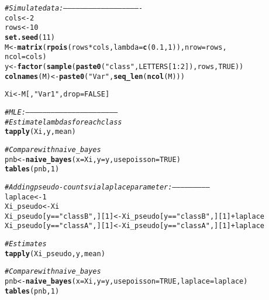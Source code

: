 \documentclass{article}\usepackage[]{graphicx}\usepackage[]{color}
\makeatletter
\newcommand{\hlnum}[1]{\textcolor[rgb]{0.686,0.059,0.569}{#1}}%
\newcommand{\hlstr}[1]{\textcolor[rgb]{0.192,0.494,0.8}{#1}}%
\newcommand{\hlcom}[1]{\textcolor[rgb]{0.678,0.584,0.686}{\textit{#1}}}%
\newcommand{\hlopt}[1]{\textcolor[rgb]{0,0,0}{#1}}%
\newcommand{\hlstd}[1]{\textcolor[rgb]{0.345,0.345,0.345}{#1}}%
\newcommand{\hlkwb}[1]{\textcolor[rgb]{0.69,0.353,0.396}{#1}}%
\newcommand{\hlkwc}[1]{\textcolor[rgb]{0.333,0.667,0.333}{#1}}%
\newcommand{\hlkwd}[1]{\textcolor[rgb]{0.737,0.353,0.396}{\textbf{#1}}}%
\newenvironment{kframe}{%
 \def\at@end@of@kframe{}%
 \ifinner\ifhmode%
  \def\at@end@of@kframe{\end{minipage}}%
  \begin{minipage}{\columnwidth}%
 \fi\fi%
 \def\FrameCommand##1{\hskip\@totalleftmargin \hskip-\fboxsep
 \colorbox{shadecolor}{##1}\hskip-\fboxsep
     \hskip-\linewidth \hskip-\@totalleftmargin \hskip\columnwidth}%
 \MakeFramed {\advance\hsize-\width
   \@totalleftmargin\z@ \linewidth\hsize
   \@setminipage}}%
 {\par\unskip\endMakeFramed%
 \at@end@of@kframe}
\newenvironment{knitrout}{}{} %
\makeatother
\begin{document}
\begin{knitrout}
\color{fgcolor}\begin{kframe}
\begin{alltt}
\hlcom{# Simulate data: -------------------------------------------------------}
\hlstd{cols} \hlkwb{<-} \hlnum{2}
\hlstd{rows} \hlkwb{<-} \hlnum{10}
\hlkwd{set.seed}\hlstd{(}\hlnum{11}\hlstd{)}
\hlstd{M} \hlkwb{<-} \hlkwd{matrix}\hlstd{(}\hlkwd{rpois}\hlstd{(rows} \hlopt{*} \hlstd{cols,} \hlkwc{lambda} \hlstd{=} \hlkwd{c}\hlstd{(}\hlnum{0.1}\hlstd{,}\hlnum{1}\hlstd{)),} \hlkwc{nrow} \hlstd{= rows,}
            \hlkwc{ncol} \hlstd{= cols)}
\hlstd{y} \hlkwb{<-} \hlkwd{factor}\hlstd{(}\hlkwd{sample}\hlstd{(}\hlkwd{paste0}\hlstd{(}\hlstr{"class"}\hlstd{, LETTERS[}\hlnum{1}\hlopt{:}\hlnum{2}\hlstd{]), rows,} \hlnum{TRUE}\hlstd{))}
\hlkwd{colnames}\hlstd{(M)} \hlkwb{<-} \hlkwd{paste0}\hlstd{(}\hlstr{"Var"}\hlstd{,} \hlkwd{seq_len}\hlstd{(}\hlkwd{ncol}\hlstd{(M)))}

\hlstd{Xi} \hlkwb{<-} \hlstd{M[ ,}\hlstr{"Var1"}\hlstd{,} \hlkwc{drop} \hlstd{=} \hlnum{FALSE}\hlstd{]}

\hlcom{# MLE: -----------------------------------------------------------------}
\hlcom{# Estimate lambdas for each class}
\hlkwd{tapply}\hlstd{(Xi, y, mean)}

\hlcom{# Compare with naive_bayes}
\hlstd{pnb} \hlkwb{<-} \hlkwd{naive_bayes}\hlstd{(}\hlkwc{x} \hlstd{= Xi,} \hlkwc{y} \hlstd{= y,} \hlkwc{usepoisson} \hlstd{=} \hlnum{TRUE}\hlstd{)}
\hlkwd{tables}\hlstd{(pnb,}\hlnum{1}\hlstd{)}

\hlcom{# Adding pseudo-counts via laplace parameter: --------------------------}
\hlstd{laplace} \hlkwb{<-} \hlnum{1}
\hlstd{Xi_pseudo} \hlkwb{<-} \hlstd{Xi}
\hlstd{Xi_pseudo[y} \hlopt{==} \hlstr{"classB"}\hlstd{,][}\hlnum{1}\hlstd{]} \hlkwb{<-} \hlstd{Xi_pseudo[y} \hlopt{==} \hlstr{"classB"}\hlstd{,][}\hlnum{1}\hlstd{]} \hlopt{+} \hlstd{laplace}
\hlstd{Xi_pseudo[y} \hlopt{==} \hlstr{"classA"}\hlstd{,][}\hlnum{1}\hlstd{]} \hlkwb{<-} \hlstd{Xi_pseudo[y} \hlopt{==} \hlstr{"classA"}\hlstd{,][}\hlnum{1}\hlstd{]} \hlopt{+} \hlstd{laplace}

\hlcom{# Estimates}
\hlkwd{tapply}\hlstd{(Xi_pseudo, y, mean)}

\hlcom{# Compare with naive_bayes}
\hlstd{pnb} \hlkwb{<-} \hlkwd{naive_bayes}\hlstd{(}\hlkwc{x} \hlstd{= Xi,} \hlkwc{y} \hlstd{= y,} \hlkwc{usepoisson} \hlstd{=} \hlnum{TRUE}\hlstd{,} \hlkwc{laplace} \hlstd{= laplace)}
\hlkwd{tables}\hlstd{(pnb,}\hlnum{1}\hlstd{)}
\end{alltt}
\end{kframe}
\end{knitrout}
\end{document}
